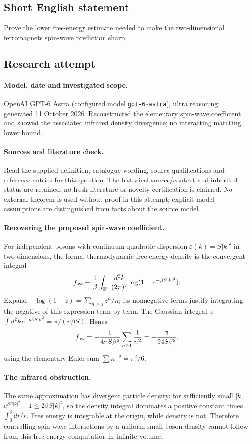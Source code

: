 \documentclass[11pt]{article}
\begin{document}
\subsection{Short English statement}
Prove the lower free-energy estimate needed to make the two-dimensional ferromagnet\textquotesingle s spin-wave prediction sharp.
\subsection{Research attempt}
\paragraph{Model, date and investigated scope.}
OpenAI GPT-6 Astra (configured model \texttt{gpt-6-astra}), ultra reasoning; generated 11 October 2026. Reconstructed the elementary spin-wave coefficient and showed the associated infrared density divergence; no interacting matching lower bound.

\paragraph{Sources and literature check.}
Read the supplied definition, catalogue wording, source qualifications and reference entries for this question. The historical source/context and inherited status are retained; no fresh literature or novelty certification is claimed. No external theorem is used without proof in this attempt; explicit model assumptions are distinguished from facts about the source model.

\paragraph{Recovering the proposed spin-wave coefficient.} For independent bosons with continuum quadratic dispersion \(\varepsilon(k)=S|k|^2\) in two dimensions, the formal thermodynamic free energy density is the convergent integral
\[
 f_{\rm sw}=\frac1\beta\int_{\mathbb R^2}\frac{d^2k}{(2\pi)^2}\log(1-e^{-\beta S|k|^2}).
\]
Expand \(-\log(1-z)=\sum_{n\ge1}z^n/n\); its nonnegative terms justify integrating the negative of this expression term by term. The Gaussian integral is \(\int d^2k\,e^{-n\beta S|k|^2}=\pi/(n\beta S)\). Hence
\[
 f_{\rm sw}=-\frac1{4\pi S\beta^2}\sum_{n\ge1}\frac1{n^2}=-\frac\pi{24S\beta^2},
\]
using the elementary Euler sum \(\sum n^{-2}=\pi^2/6\).
\paragraph{The infrared obstruction.} The same approximation has divergent particle density: for sufficiently small \(|k|\), \(e^{\beta S|k|^2}-1\le2\beta S|k|^2\), so the density integral dominates a positive constant times \(\int_0^\delta dr/r\). Free energy is integrable at the origin, while density is not. Therefore controlling spin-wave interactions by a uniform small boson density cannot follow from this free-energy computation in infinite volume.
\end{document}
